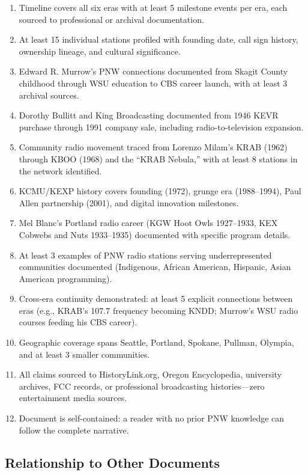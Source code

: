 \documentclass[11pt,letterpaper]{article}
\begin{document}
\begin{enumerate}[leftmargin=2em]
\item Timeline covers all six eras with at least 5 milestone events per era, each sourced to professional or archival documentation.
\item At least 15 individual stations profiled with founding date, call sign history, ownership lineage, and cultural significance.
\item Edward R. Murrow's PNW connections documented from Skagit County childhood through WSU education to CBS career launch, with at least 3 archival sources.
\item Dorothy Bullitt and King Broadcasting documented from 1946 KEVR purchase through 1991 company sale, including radio-to-television expansion.
\item Community radio movement traced from Lorenzo Milam's KRAB (1962) through KBOO (1968) and the ``KRAB Nebula,'' with at least 8 stations in the network identified.
\item KCMU/KEXP history covers founding (1972), grunge era (1988--1994), Paul Allen partnership (2001), and digital innovation milestones.
\item Mel Blanc's Portland radio career (KGW Hoot Owls 1927--1933, KEX Cobwebs and Nuts 1933--1935) documented with specific program details.
\item At least 3 examples of PNW radio stations serving underrepresented communities documented (Indigenous, African American, Hispanic, Asian American programming).
\item Cross-era continuity demonstrated: at least 5 explicit connections between eras (e.g., KRAB's 107.7 frequency becoming KNDD; Murrow's WSU radio courses feeding his CBS career).
\item Geographic coverage spans Seattle, Portland, Spokane, Pullman, Olympia, and at least 3 smaller communities.
\item All claims sourced to HistoryLink.org, Oregon Encyclopedia, university archives, FCC records, or professional broadcasting histories---zero entertainment media sources.
\item Document is self-contained: a reader with no prior PNW knowledge can follow the complete narrative.
\end{enumerate}

\subsection{Relationship to Other Documents}
\end{document}

